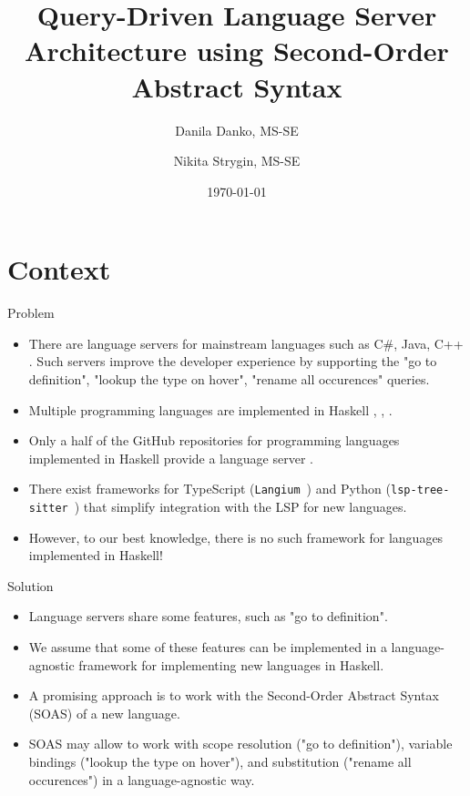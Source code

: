 \documentclass[serif, aspectratio=169]{beamer}
\author[Danko, Strygin]{Danila Danko, MS-SE \inst{1} \and Nikita Strygin, MS-SE \inst{1} \and \newline \newline {Supervisor: Nikolai Kudasov \inst{1}}}
\title{Query-Driven Language Server Architecture using Second-Order Abstract Syntax}
\institute{
    \inst{1}Innopolis University
}
\date{\small \today}
\begin{document}
\begin{frame}
    \titlepage
\end{frame}

\begin{frame}
    \tableofcontents[sectionstyle=show,
        subsectionstyle=show/shaded/hide,
        subsubsectionstyle=show/shaded/hide]
\end{frame}

\section{Context}

\begin{frame}{Problem}
    \begin{itemize}
        [<+-| alert+>] %
        \item There are language servers \cite{noauthor_language_server_protocol_2024} for mainstream languages such as C\#, Java, C++ \cite{lsp_implementations}. Such servers improve the developer experience by supporting the "go to definition", "lookup the type on hover", "rename all occurences" queries.
        \item Multiple programming languages are implemented in Haskell \cite{github_haskell_programming_language}, \cite{hackage_formal_languages}, \cite{hackage_language}.
        \item Only a half of the GitHub repositories for programming languages implemented in Haskell provide a language server \cite{github_lsp_module}.
        \item There exist frameworks for TypeScript (\texttt{Langium}~\cite{noauthor_langium_nodate}) and Python (\texttt{lsp-tree-sitter}~\cite{noauthor_neomuttlsp-tree-sitter_2024}) that simplify integration with the LSP for new languages.
        \item However, to our best knowledge, there is no such framework for languages implemented in Haskell!
    \end{itemize}
\end{frame}

\begin{frame}{Solution}
    \begin{itemize}
        [<+-| alert+>] %
        \item Language servers share some features, such as "go to definition".
        \item We assume that some of these features can be implemented in a language-agnostic framework for implementing new languages in Haskell.
        \item A promising approach is to work with the Second-Order Abstract Syntax (SOAS) \cite{fiore_formal_2022} of a new language.
        \item SOAS may allow to work with scope resolution ("go to definition"), variable bindings ("lookup the type on hover"), and substitution ("rename all occurences") in a language-agnostic way.
    \end{itemize}
\end{frame}
\end{document}
